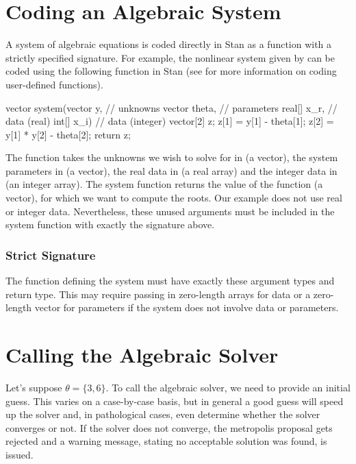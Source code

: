\section{Coding an Algebraic System}

A system of algebraic equations is coded directly in Stan as a function with a
strictly specified signature. For example, the nonlinear system given by
 can be coded using the following function
in Stan (see  for
more information on coding user-defined functions).
%
\begin{stancode}
vector system(vector y,        // unknowns
              vector theta,    // parameters
              real[] x_r,      // data (real)
              int[] x_i) {     // data (integer)
  vector[2] z;
  z[1] = y[1] - theta[1];
  z[2] = y[1] * y[2] - theta[2];
  return z;
}
\end{stancode}
%
The function takes the unknowns we wish to solve for in  (a vector),
the system parameters in  (a vector), the real data in
 (a real array) and the integer data in  (an integer array). The
system function returns the value of the function (a vector), for which we want to compute
the roots. Our example does not use real or integer data. Nevertheless, these
unused arguments must be included in the system function with exactly the
signature above.

\subsubsection{Strict Signature}
%
The function defining the system must have exactly these argument types and
return type. This may require passing in zero-length arrays for data or a zero-length
vector for parameters if the system does not involve data or parameters.

\section{Calling the Algebraic Solver}
%
Let's suppose $\theta = \{3, 6\}$. To call the algebraic solver, we need to
provide an initial guess. This varies on a case-by-case basis, but in general
a good guess will speed up the solver and, in pathological cases, even determine
whether the solver converges or not. If the solver does not converge, the metropolis
proposal gets rejected and a warning message, stating no acceptable solution was
found, is issued.

